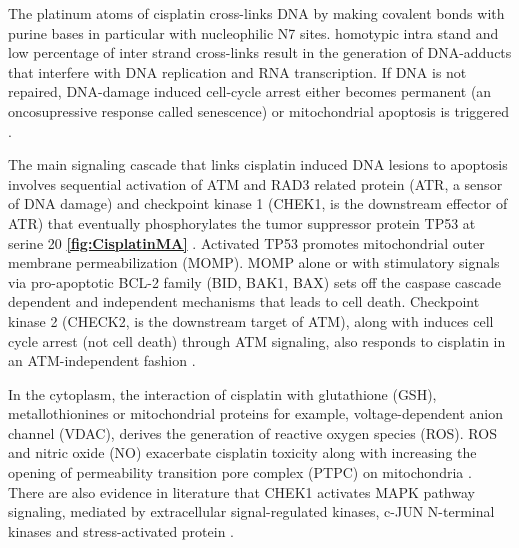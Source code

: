 The platinum atoms of cisplatin cross-links DNA by making covalent bonds with purine bases in particular with nucleophilic N7 sites. homotypic intra stand and low percentage of inter strand cross-links result in the generation of DNA-adducts that interfere with DNA replication and RNA transcription. If DNA is not repaired, DNA-damage induced cell-cycle arrest either becomes permanent (an oncosupressive response called senescence) or mitochondrial apoptosis is triggered \cite{fichtinger1985adducts, rabik2007molecular,lopez2013hallmarks}. 

The main signaling cascade that links cisplatin induced DNA lesions to apoptosis involves sequential activation of ATM and RAD3 related protein (ATR, a sensor of DNA damage) and checkpoint kinase 1 (CHEK1, is the downstream effector of ATR) that  eventually phosphorylates the tumor suppressor protein TP53 at serine 20  \textbf{\autoref{fig:CisplatinMA}} \cite{shieh2000human, cimprich2008atr}. Activated TP53 promotes mitochondrial outer membrane permeabilization (MOMP).  MOMP alone or with stimulatory signals via pro-apoptotic BCL-2 family (BID, BAK1, BAX) \cite {tajeddine2008hierarchical} sets off the caspase cascade dependent and independent mechanisms that leads to cell death. Checkpoint kinase 2 (CHECK2, is the downstream target of ATM), along with induces cell cycle arrest  (not cell death) through ATM signaling, also responds to cisplatin in an ATM-independent fashion \cite{pabla2008atr}. 

In the cytoplasm, the interaction of cisplatin with glutathione (GSH), metallothionines or mitochondrial proteins for example, voltage-dependent anion channel (VDAC), derives the generation of reactive oxygen species (ROS). ROS and nitric oxide (NO) exacerbate cisplatin toxicity along with increasing the opening of permeability transition pore complex (PTPC) on mitochondria \cite{godoy2012endogenously}. There are also evidence in literature that CHEK1 activates MAPK pathway signaling, mediated by extracellular signal-regulated kinases, c-JUN N-terminal kinases and stress-activated protein \cite{persons2000effect, yeh2002increase}.

